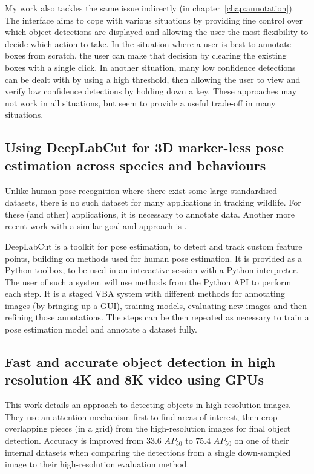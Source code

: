 My work also tackles the same issue indirectly (in chapter~\ref{chap:annotation}). The interface aims to cope with various situations by providing fine control over which object detections are displayed and allowing the user the most flexibility to decide which action to take. In the situation where a user is best to annotate boxes from scratch, the user can make that decision by clearing the existing boxes with a single click. In another situation, many low confidence detections can be dealt with by using a high threshold, then allowing the user to view and verify low confidence detections by holding down a key. These approaches may not work in all situations, but seem to provide a useful trade-off in many situations.

\subsection {Using DeepLabCut for 3D marker-less pose estimation across species and behaviours \cite{Nath2018, Mathis2018}}

Unlike human pose recognition where there exist some large standardised datasets, there is no such dataset for many applications in tracking wildlife. For these (and other) applications, it is necessary to annotate data. Another more recent work with a similar goal and approach is \cite{Graving2019}.

DeepLabCut is a toolkit for pose estimation, to detect and track custom feature points, building on methods used for human pose estimation. It is provided as a Python toolbox, to be used in an interactive session with a Python interpreter. The user of such a system will use methods from the Python \gls{API} to perform each step. It is a staged \gls{VBA} system with different methods for annotating images (by bringing up a GUI), training models, evaluating new images and then refining those annotations. The steps can be then repeated as necessary to train a pose estimation model and annotate a dataset fully. 

\subsection{Fast and accurate object detection in high resolution 4K and 8K video using GPUs \cite{Ruzicka2018}}

This work details an approach to detecting objects in high-resolution images. They use an attention mechanism first to find areas of interest, then crop overlapping pieces (in a grid) from the high-resolution images for final object detection. Accuracy is improved from 33.6 $AP_{50}$ to 75.4 $AP_{50}$ on one of their internal datasets when comparing the detections from a single down-sampled image to their high-resolution evaluation method. 

